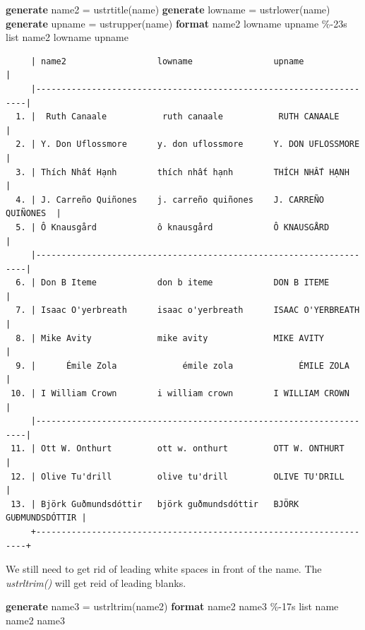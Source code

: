 \documentclass[
]{book}
\newenvironment{Shaded}{\begin{snugshade}}{\end{snugshade}}
\newcommand{\BaseNTok}[1]{\textcolor[rgb]{0.00,0.00,0.81}{#1}}
\newcommand{\KeywordTok}[1]{\textcolor[rgb]{0.13,0.29,0.53}{\textbf{#1}}}
\newcommand{\NormalTok}[1]{#1}
\newcommand{\OtherTok}[1]{\textcolor[rgb]{0.56,0.35,0.01}{#1}}
\begin{document}
\begin{Shaded}
\begin{Highlighting}[]
\KeywordTok{generate}\NormalTok{ name2 = ustrtitle(}\BaseNTok{name}\NormalTok{)}
\KeywordTok{generate}\NormalTok{ lowname = ustrlower(}\BaseNTok{name}\NormalTok{)}
\KeywordTok{generate}\NormalTok{ upname = ustrupper(}\BaseNTok{name}\NormalTok{)}
\KeywordTok{format}\NormalTok{ name2 lowname upname \%{-}23s}
\OtherTok{list}\NormalTok{ name2 lowname upname}
\end{Highlighting}
\end{Shaded}

\begin{verbatim}
     | name2                  lowname                upname               |
     |--------------------------------------------------------------------|
  1. |  Ruth Canaale           ruth canaale           RUTH CANAALE        |
  2. | Y. Don Uflossmore      y. don uflossmore      Y. DON UFLOSSMORE    |
  3. | Thích Nhất Hạnh        thích nhất hạnh        THÍCH NHẤT HẠNH      |
  4. | J. Carreño Quiñones    j. carreño quiñones    J. CARREÑO QUIÑONES  |
  5. | Ô Knausgård            ô knausgård            Ô KNAUSGÅRD          |
     |--------------------------------------------------------------------|
  6. | Don B Iteme            don b iteme            DON B ITEME          |
  7. | Isaac O'yerbreath      isaac o'yerbreath      ISAAC O'YERBREATH    |
  8. | Mike Avity             mike avity             MIKE AVITY           |
  9. |      Émile Zola             émile zola             ÉMILE ZOLA      |
 10. | I William Crown        i william crown        I WILLIAM CROWN      |
     |--------------------------------------------------------------------|
 11. | Ott W. Onthurt         ott w. onthurt         OTT W. ONTHURT       |
 12. | Olive Tu'drill         olive tu'drill         OLIVE TU'DRILL       |
 13. | Björk Guðmundsdóttir   björk guðmundsdóttir   BJÖRK GUÐMUNDSDÓTTIR |
     +--------------------------------------------------------------------+
\end{verbatim}

We still need to get rid of leading white spaces in front of the name. The \emph{ustrltrim()} will get reid of leading blanks.

\begin{Shaded}
\begin{Highlighting}[]
\KeywordTok{generate}\NormalTok{ name3 = ustrltrim(name2)}
\KeywordTok{format}\NormalTok{ name2 name3 \%{-}17s}
\OtherTok{list} \BaseNTok{name}\NormalTok{ name2 name3}
\end{Highlighting}
\end{Shaded}
\end{document}
